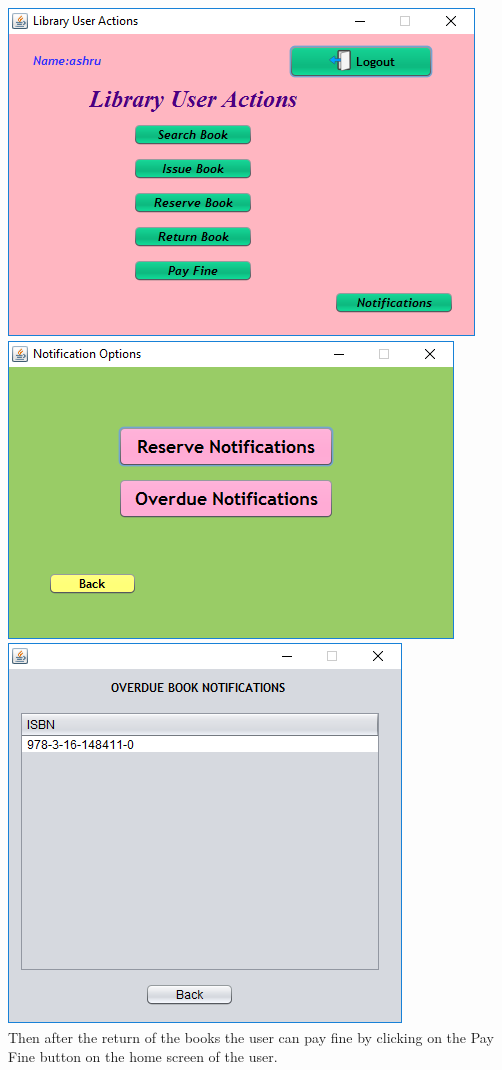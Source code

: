 \documentclass{article}
\begin{document}
\begin{enumerate}
	\includegraphics[scale=0.8]{images/UserLogin/UserActions.PNG}\\
	\includegraphics[scale=0.8]{images/UserLogin/Actions/NotificationWindow.PNG}\\
	\includegraphics[scale=0.8]{images/UserLogin/Actions/OverdueNotifications.PNG}\\
	Then after the return of the books the user can pay fine by clicking on the Pay Fine button on the home screen of the user.\\
	

\end{enumerate}
\end{document}
